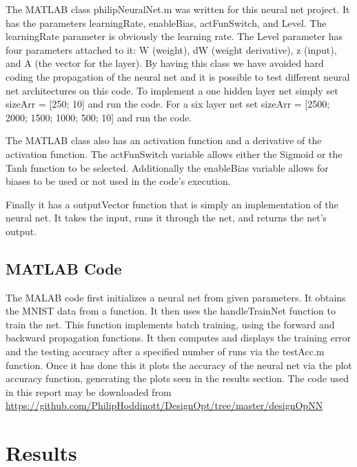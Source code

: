 \documentclass[12pt]{article}
\begin{document}
	
	The MATLAB class philipNeuralNet.m was written for this neural net project. It has the parameters learningRate, enableBias, actFunSwitch, and Level. The learningRate parameter is obviously the learning rate. The Level parameter has four parameters attached to it: W (weight), dW (weight derivative),  z (input), and A (the vector for the layer). By having this class we have avoided hard coding the propagation of the neural net and it is possible to test different neural net architectures on this code. To implement a one hidden layer net simply set sizeArr = [250; 10] and run the code.  For a six layer net set sizeArr = [2500; 2000; 1500; 1000; 500; 10] and run the code.\par 
	
	The MATLAB class also has an activation function and a derivative of the activation function. The actFunSwitch variable allows either the Sigmoid or the Tanh function to be selected. Additionally the enableBias variable allows for biases to be used or not used in the code's execution. \par 
	Finally it has a outputVector function that is simply an implementation of the neural net. It takes the input, runs it through the net, and returns the net's output. \par 
	
	
	
	\subsection{MATLAB Code}
	The MALAB code first initializes a neural net from given parameters. It obtains the MNIST data from a function\cite{usingMNIST}. It then uses the handleTrainNet function to train the net. This function implements batch training, using the forward and backward propagation functions. It then computes and displays the training error and the testing accuracy after a specified number of runs via the testAcc.m function. Once it has done this it plots the accuracy of the neural net via the plot accuracy function, generating the plots seen in the results section. The code used in this report may be downloaded from \url{https://github.com/PhilipHoddinott/DesignOpt/tree/master/designOpNN}\par 
	
	
	 
	
	
	\section{Results}
\end{document}
